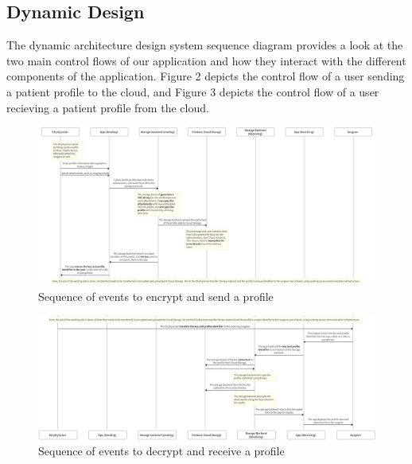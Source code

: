 \documentclass[11pt,letterpaper]{article}
\begin{document}
\subsection{Dynamic Design}

The dynamic architecture design system sequence diagram provides a look at the two main control flows of our application and how they interact with the different components of the application. Figure 2 depicts the control flow of a user sending a patient profile to the cloud, and Figure 3 depicts the control flow of a user recieving a patient profile from the cloud. 



\begin{landscape}
\begin{figure}
    \centering
    \includegraphics[width=9in]{sequence-diagram-1.png}
    \caption{Sequence of events to encrypt and send a profile}
    \label{fig:sequence-1}
\end{figure}
\begin{figure}
    \ContinuedFloat
    \centering
    \includegraphics[width=9in]{sequence-diagram-2.png}
    \caption{Sequence of events to decrypt and receive a profile}
    \label{fig:sequence-2}
\end{figure}
\end{landscape}
\end{document}
